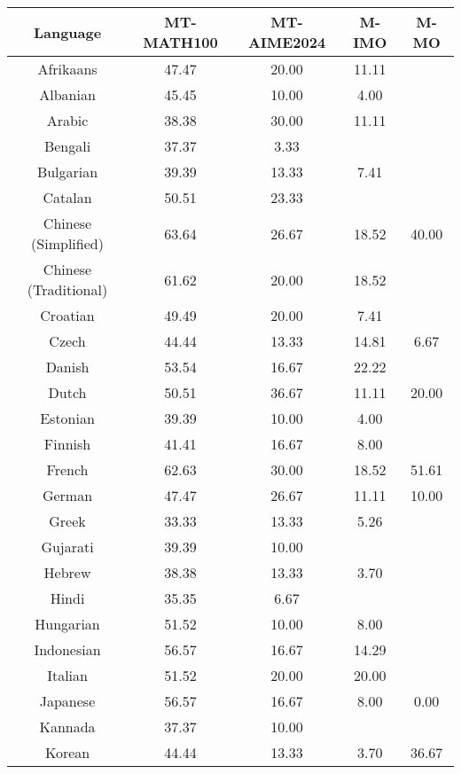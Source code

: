\begin{table*}[]
\centering
\fontsize{9}{11} \selectfont
\begin{tabular}{c|cccl}
\toprule
\textbf{Language} & \textbf{MT-MATH100} & \textbf{MT-AIME2024} & \textbf{M-IMO} & \multicolumn{1}{c}{\textbf{M-MO}} \\ \midrule
Afrikaans & 47.47 & 20.00 & 11.11 &  \\
Albanian & 45.45 & 10.00 & 4.00 &  \\
Arabic & 38.38 & 30.00 & 11.11 &  \\
Bengali & 37.37 & 3.33 & \multicolumn{1}{l}{} &  \\
Bulgarian & 39.39 & 13.33 & 7.41 &  \\
Catalan & 50.51 & 23.33 & \multicolumn{1}{l}{} &  \\
Chinese (Simplified) & 63.64 & 26.67 & 18.52 & \multicolumn{1}{c}{40.00} \\
Chinese (Traditional) & 61.62 & 20.00 & 18.52 &  \\
Croatian & 49.49 & 20.00 & 7.41 &  \\
Czech & 44.44 & 13.33 & 14.81 & \multicolumn{1}{c}{6.67} \\
Danish & 53.54 & 16.67 & 22.22 &  \\
Dutch & 50.51 & 36.67 & 11.11 & \multicolumn{1}{c}{20.00} \\
Estonian & 39.39 & 10.00 & 4.00 &  \\
Finnish & 41.41 & 16.67 & 8.00 &  \\
French & 62.63 & 30.00 & 18.52 & \multicolumn{1}{c}{51.61} \\
German & 47.47 & 26.67 & 11.11 & \multicolumn{1}{c}{10.00} \\
Greek & 33.33 & 13.33 & 5.26 &  \\
Gujarati & 39.39 & 10.00 & \multicolumn{1}{l}{} &  \\
Hebrew & 38.38 & 13.33 & 3.70 &  \\
Hindi & 35.35 & 6.67 & \multicolumn{1}{l}{} &  \\
Hungarian & 51.52 & 10.00 & 8.00 &  \\
Indonesian & 56.57 & 16.67 & 14.29 &  \\
Italian & 51.52 & 20.00 & 20.00 &  \\
Japanese & 56.57 & 16.67 & 8.00 & \multicolumn{1}{c}{0.00} \\
Kannada & 37.37 & 10.00 & \multicolumn{1}{l}{} &  \\
Korean & 44.44 & 13.33 & 3.70 & \multicolumn{1}{c}{36.67} \\

\end{tabular}
\end{table*}
